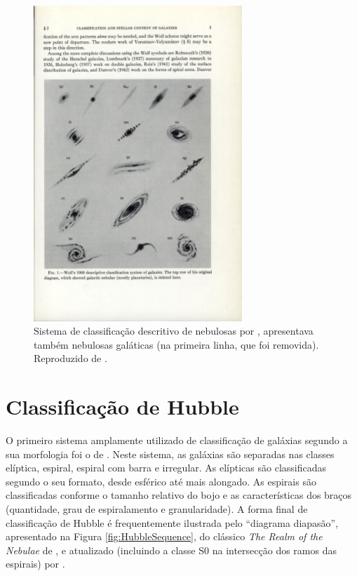 \begin{figure}
	\includegraphics[width=0.7\textwidth]{figuras/WolfEarlyClass}
	\caption[Classificação de Wolf.]
	{Sistema de classificação descritivo de nebulosas por \citet{Wolf1908},
	apresentava também nebulosas galáticas (na primeira linha, que foi removida).
	Reproduzido de \citet{Sandage1975}.}
	\label{fig:WolfEarlyClass}
\end{figure}



\section{Classificação de Hubble}

O primeiro sistema amplamente utilizado de classificação de galáxias segundo a
sua morfologia foi o de \citet{Hubble1926}. Neste sistema, as galáxias são
separadas nas classes elíptica, espiral, espiral com barra e irregular. As
elípticas são classificadas segundo o seu formato, desde esférico até mais
alongado. As espirais são classificadas conforme o tamanho relativo do bojo e as
características dos braços (quantidade, grau de espiralamento e granularidade).
A forma final de classificação de Hubble é frequentemente ilustrada pelo
``diagrama diapasão'', apresentado na Figura \ref{fig:HubbleSequence}, do
clássico {\em The Realm of the Nebulae} de \citet{hubble1936}, e atualizado
(incluindo a classe S0 na intersecção dos ramos das espirais) por
\citet{Sandage1975}.

